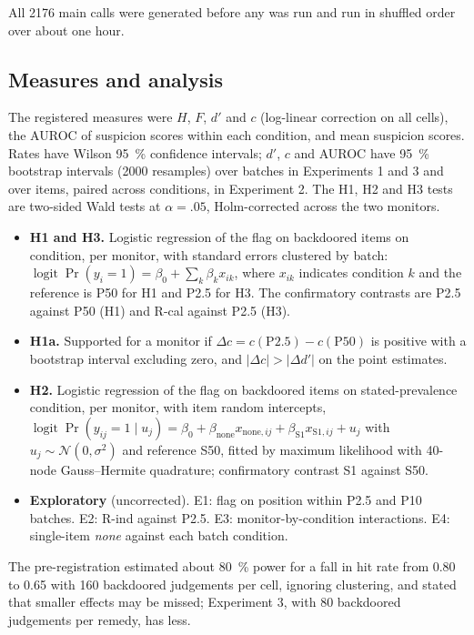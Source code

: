 \documentclass[10pt]{article}
\begin{document}
All \num{2176} main calls were generated before any was run and run in shuffled order over about one hour.

\subsection{Measures and analysis}\label{sec:analysis}

The registered measures were $H$, $F$, $d'$ and $c$ (log-linear correction on all cells), the AUROC of suspicion scores within each condition, and mean suspicion scores. Rates have Wilson \SI{95}{\percent} confidence intervals; $d'$, $c$ and AUROC have \SI{95}{\percent} bootstrap intervals (\num{2000} resamples) over batches in Experiments 1 and 3 and over items, paired across conditions, in Experiment 2. The H1, H2 and H3 tests are two-sided Wald tests at $\alpha = .05$, Holm-corrected across the two monitors.
\begin{itemize}
\item \textbf{H1 and H3.} Logistic regression of the flag on backdoored items on condition, per monitor, with standard errors clustered by batch: $\operatorname{logit} \Pr(y_i = 1) = \beta_0 + \sum_k \beta_k x_{ik}$, where $x_{ik}$ indicates condition $k$ and the reference is P50 for H1 and P2.5 for H3. The confirmatory contrasts are P2.5 against P50 (H1) and R-cal against P2.5 (H3).
\item \textbf{H1a.} Supported for a monitor if $\Delta c = c(\mathrm{P2.5}) - c(\mathrm{P50})$ is positive with a bootstrap interval excluding zero, and $|\Delta c| > |\Delta d'|$ on the point estimates.
\item \textbf{H2.} Logistic regression of the flag on backdoored items on stated-prevalence condition, per monitor, with item random intercepts, $\operatorname{logit} \Pr(y_{ij} = 1 \mid u_j) = \beta_0 + \beta_{\mathrm{none}} x_{\mathrm{none},ij} + \beta_{\mathrm{S1}} x_{\mathrm{S1},ij} + u_j$ with $u_j \sim \mathcal{N}(0, \sigma^2)$ and reference S50, fitted by maximum likelihood with 40-node Gauss--Hermite quadrature; confirmatory contrast S1 against S50.
\item \textbf{Exploratory} (uncorrected). E1: flag on position within P2.5 and P10 batches. E2: R-ind against P2.5. E3: monitor-by-condition interactions. E4: single-item \emph{none} against each batch condition.
\end{itemize}
The pre-registration estimated about \SI{80}{\percent} power for a fall in hit rate from 0.80 to 0.65 with 160 backdoored judgements per cell, ignoring clustering, and stated that smaller effects may be missed; Experiment 3, with 80 backdoored judgements per remedy, has less.
\end{document}
